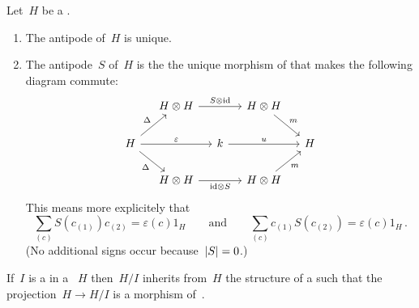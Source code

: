 \documentclass[a4paper,10pt,headings=standardclasses]{scrartcl}
\begin{document}
\begin{remark}
  Let~$H$ be a {\dgh}.
  \begin{enumerate}
    \item
      The antipode of~$H$ is unique.
    \item
      The antipode~$S$ of~$H$ is the the unique morphism of {\dgvs} that makes the following diagram commute:
      \begin{equation}
        \label{antipode diagram}
        \begin{tikzcd}[column sep = small]
          {}
          &
          H \tensor H
          \arrow{rr}[above]{S \tensor {\id}}
          &
          {}
          &
          H \tensor H
          \arrow{dr}[above right]{m}
          &
          {}
          \\
          H
          \arrow{ur}[above left]{\Delta}
          \arrow{rr}[above]{\varepsilon}
          \arrow{dr}[below left]{\Delta}
          &
          {}
          &
          k
          \arrow{rr}[above]{u}
          &
          {}
          &
          H
          \\
          {}
          &
          H \tensor H
          \arrow{rr}[below]{{\id} \tensor S}
          &
          {}
          &
          H \tensor H
          \arrow{ur}[below right]{m}
          &
          {}
        \end{tikzcd}
      \end{equation}
      This means more explicitely that
      \[
        \sum_{(c)} S(c_{(1)}) c_{(2)}
        =
        \varepsilon(c) 1_H
        \qquad\text{and}\qquad
        \sum_{(c)} c_{(1)} S(c_{(2)})
        =
        \varepsilon(c) 1_H  \,.
      \]
      (No additional signs occur because~$\lvert S\rvert = 0$.)
  \end{enumerate}
\end{remark}%

\begin{lemma}
  If~$I$ is a {\dghi} in a {\dgh}~$H$ then~$H/I$ inherits from~$H$ the structure of a {\dgh} such that the projection~$H \to H/I$ is a morphism of~{\dghs}.
\end{lemma}

% 
\end{document}
